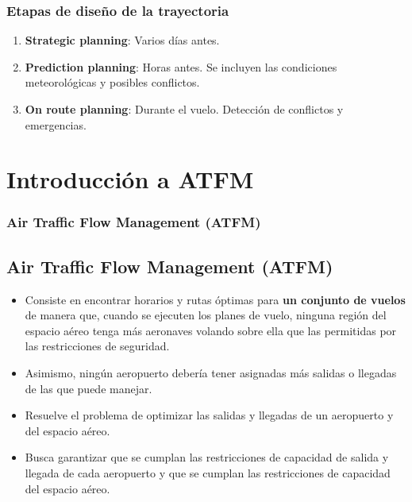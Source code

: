 
\begin{frame}
    \frametitle{Etapas de diseño de la trayectoria}
    \begin{enumerate}
        \item \textbf{Strategic planning}: Varios días antes.
        \item \textbf{Prediction planning}: Horas antes. Se incluyen las condiciones meteorológicas y posibles conflictos.
        \item \textbf{On route planning}: Durante el vuelo. Detección de conflictos y emergencias.
    \end{enumerate}
\end{frame}


\section{Introducción a ATFM}
\begin{frame}
    \frametitle{Air Traffic Flow Management (ATFM)}
    \subsection{Air Traffic Flow Management (ATFM)}
    \begin{itemize}
        \item Consiste en encontrar horarios y rutas óptimas para \textbf{un conjunto de vuelos} de manera que,
              cuando se ejecuten los planes de vuelo, ninguna región del espacio aéreo tenga más
              aeronaves volando sobre ella que las permitidas por las restricciones de seguridad.
        \item Asimismo, ningún aeropuerto debería tener asignadas más salidas o llegadas de las que puede manejar.
        \item Resuelve el problema de optimizar las salidas y llegadas de un aeropuerto y del espacio aéreo.
        \item Busca garantizar que se cumplan las restricciones de capacidad de salida y
              llegada de cada aeropuerto y que se cumplan las restricciones de capacidad del espacio aéreo.
    \end{itemize}
\end{frame}

